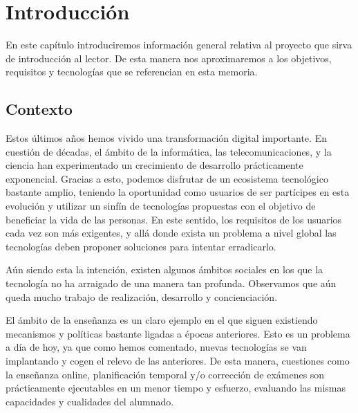 \documentclass[a4paper, 12pt]{book}
\begin{document}

\cleardoublepage
\chapter{Introducción}
\label{sec:intro} %

En este capítulo introduciremos información general relativa al proyecto
que sirva de introducción al lector. De esta manera nos aproximaremos a los
objetivos, requisitos y tecnologías que se referencian en esta memoria.

\section{Contexto}
\label{sec:Contexto}

Estos últimos años hemos vivido una transformación digital
importante. En cuestión de décadas, el ámbito de la informática, las
telecomunicaciones, y la ciencia han experimentado un crecimiento
de desarrollo prácticamente exponencial. Gracias a esto, podemos disfrutar
de un ecosistema tecnológico bastante amplio, teniendo la oportunidad como
usuarios de ser partícipes en esta evolución y utilizar un sinfín de
tecnologías propuestas con el objetivo de beneficiar la vida de las personas.
En este sentido, los requisitos de los usuarios cada vez son más exigentes,
y allá donde exista un problema a nivel global las tecnologías deben proponer
soluciones para intentar erradicarlo.

Aún siendo esta la intención, existen algunos ámbitos sociales en los que la
tecnología no ha arraigado de una manera tan profunda. Observamos que aún queda
mucho trabajo de realización, desarrollo y concienciación.

El ámbito de la enseñanza es un claro ejemplo en el que siguen existiendo
mecanismos y políticas bastante ligadas a épocas anteriores. Esto es un
problema a día de hoy, ya que como hemos comentado, nuevas tecnologías se
van implantando y cogen el relevo de las anteriores. De esta manera, cuestiones
como la enseñanza online, planificación temporal y/o corrección de exámenes
son prácticamente ejecutables en un menor tiempo y esfuerzo, evaluando las
mismas capacidades y cualidades del alumnado.
\end{document}
